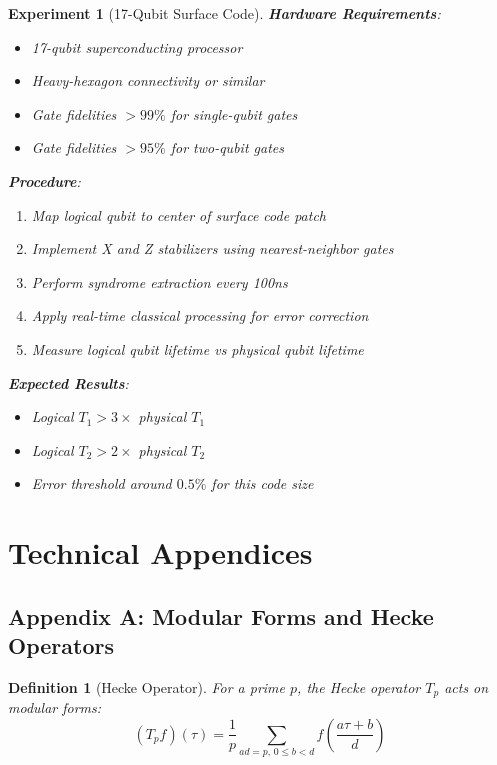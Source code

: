 \documentclass[12pt,a4paper]{article}
\newtheorem{definition}[theorem]{Definition}
\newtheorem{experiment}[theorem]{Experiment}
\begin{document}
\begin{experiment}[17-Qubit Surface Code]
\textbf{Hardware Requirements}:
\begin{itemize}
\item 17-qubit superconducting processor
\item Heavy-hexagon connectivity or similar
\item Gate fidelities $> 99\%$ for single-qubit gates
\item Gate fidelities $> 95\%$ for two-qubit gates
\end{itemize}

\textbf{Procedure}:
\begin{enumerate}
\item Map logical qubit to center of surface code patch
\item Implement X and Z stabilizers using nearest-neighbor gates
\item Perform syndrome extraction every 100ns
\item Apply real-time classical processing for error correction
\item Measure logical qubit lifetime vs physical qubit lifetime
\end{enumerate}

\textbf{Expected Results}:
\begin{itemize}
\item Logical $T_1 > 3 \times$ physical $T_1$
\item Logical $T_2 > 2 \times$ physical $T_2$
\item Error threshold around $0.5\%$ for this code size
\end{itemize}
\end{experiment}

\section{Technical Appendices}

\subsection{Appendix A: Modular Forms and Hecke Operators}

\begin{definition}[Hecke Operator]
For a prime $p$, the Hecke operator $T_p$ acts on modular forms:
\[
(T_p f)(\tau) = \frac{1}{p} \sum_{ad=p,\, 0 \leq b < d} f\left(\frac{a\tau + b}{d}\right)
\]
\end{definition}
\end{document}
